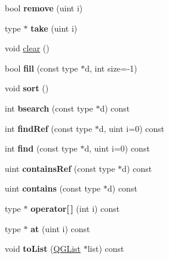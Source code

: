 \begin{DoxyCompactItemize}
\item 
\hypertarget{class_q_vector_ab135b8c4b6ad3faed8669a22d116c54a}{bool {\bfseries remove} (uint i)}\label{class_q_vector_ab135b8c4b6ad3faed8669a22d116c54a}

\item 
\hypertarget{class_q_vector_af2fa9fae3823611f2e064fd74961e11c}{type $\ast$ {\bfseries take} (uint i)}\label{class_q_vector_af2fa9fae3823611f2e064fd74961e11c}

\item 
void \hyperlink{class_q_vector_ac8bb3912a3ce86b15842e79d0b421204}{clear} ()
\item 
\hypertarget{class_q_vector_a43566976d1bfe5bb0e9d57e97e84ec83}{bool {\bfseries fill} (const type $\ast$d, int size=-\/1)}\label{class_q_vector_a43566976d1bfe5bb0e9d57e97e84ec83}

\item 
\hypertarget{class_q_vector_a47fdc9eea42b6975cdc835bb2e08810e}{void {\bfseries sort} ()}\label{class_q_vector_a47fdc9eea42b6975cdc835bb2e08810e}

\item 
\hypertarget{class_q_vector_a923b8e631f6a6bc4feaaf99c39b457b5}{int {\bfseries bsearch} (const type $\ast$d) const }\label{class_q_vector_a923b8e631f6a6bc4feaaf99c39b457b5}

\item 
\hypertarget{class_q_vector_a439eeb90c906d15d097fb916faab357e}{int {\bfseries find\-Ref} (const type $\ast$d, uint i=0) const }\label{class_q_vector_a439eeb90c906d15d097fb916faab357e}

\item 
\hypertarget{class_q_vector_afdb1c90331556e949fb5d781d5b48612}{int {\bfseries find} (const type $\ast$d, uint i=0) const }\label{class_q_vector_afdb1c90331556e949fb5d781d5b48612}

\item 
\hypertarget{class_q_vector_a447d3917e40cb014d706c038b4688847}{uint {\bfseries contains\-Ref} (const type $\ast$d) const }\label{class_q_vector_a447d3917e40cb014d706c038b4688847}

\item 
\hypertarget{class_q_vector_a9cbdf809be13269d55f7ee417f8dcec3}{uint {\bfseries contains} (const type $\ast$d) const }\label{class_q_vector_a9cbdf809be13269d55f7ee417f8dcec3}

\item 
\hypertarget{class_q_vector_a9f85283498666a8ce87d026990520f3e}{type $\ast$ {\bfseries operator\mbox{[}$\,$\mbox{]}} (int i) const }\label{class_q_vector_a9f85283498666a8ce87d026990520f3e}

\item 
\hypertarget{class_q_vector_aec67fa84316d980bf140e94795699009}{type $\ast$ {\bfseries at} (uint i) const }\label{class_q_vector_aec67fa84316d980bf140e94795699009}

\item 
\hypertarget{class_q_vector_a94d34fc2a8b135ce61da57d7155f6a47}{void {\bfseries to\-List} (\hyperlink{class_q_g_list}{Q\-G\-List} $\ast$list) const }\label{class_q_vector_a94d34fc2a8b135ce61da57d7155f6a47}

\end{DoxyCompactItemize}
